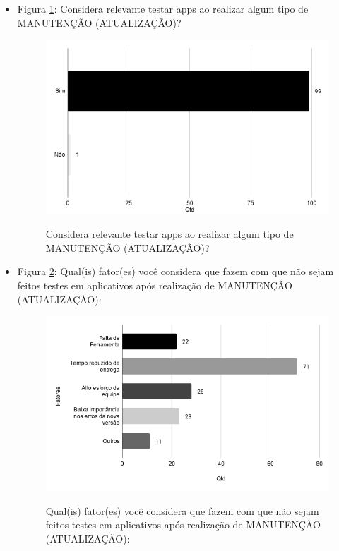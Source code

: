 \begin{itemize}
    
    \item Figura \ref{figure:s_imptestarmanutencao}: Considera relevante testar apps ao realizar algum tipo de MANUTENÇÃO (ATUALIZAÇÃO)?
    \begin{figure}[!htb]
    \centering
    \includegraphics[width=.80\textwidth]{images/s_imptestarmanutencao.png}
    \label{figure:s_imptestarmanutencao}
    \caption{Considera relevante testar apps ao realizar algum tipo de MANUTENÇÃO (ATUALIZAÇÃO)?}
    \end{figure}
    
    
    \item Figura \ref{figure:s_fatorestestemanutencao}: Qual(is) fator(es) você considera que fazem com que não sejam feitos testes em aplicativos após realização de MANUTENÇÃO (ATUALIZAÇÃO):
    \begin{figure}[!htb]
    \centering
    \includegraphics[width=.80\textwidth]{images/s_fatorestestemanutencao.png}
    \label{figure:s_fatorestestemanutencao}
    \caption{Qual(is) fator(es) você considera que fazem com que não sejam feitos testes em aplicativos após realização de MANUTENÇÃO (ATUALIZAÇÃO):}
    \end{figure}
    


\end{itemize}
